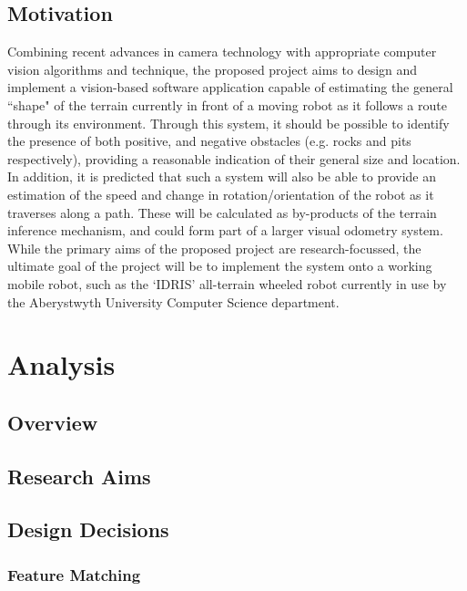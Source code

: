 \subsection{Motivation}

Combining recent advances in camera technology with appropriate computer vision algorithms and technique, the proposed project aims to design and implement a vision-based software application capable of estimating the general ``shape" of the terrain currently in front of a moving robot as it follows a route through its environment. Through this system, it should be possible to identify the presence of both positive, and negative obstacles (e.g. rocks and pits respectively), providing a reasonable indication of their general size and location. \\

In addition, it is predicted that such a system will also be able to provide an estimation of the speed and change in rotation/orientation of the robot as it traverses along a path. These will be calculated as by-products of the terrain inference mechanism, and could form part of a larger visual odometry system. \\

While the primary aims of the proposed project are research-focussed, the ultimate goal of the project will be to implement the system onto a working mobile robot, such as the `IDRIS' all-terrain wheeled robot currently in use by the Aberystwyth University Computer Science department. \\

\section{Analysis}


\subsection{Overview}


\subsection{Research Aims}


\subsection{Design Decisions}

\subsubsection{Feature Matching}

